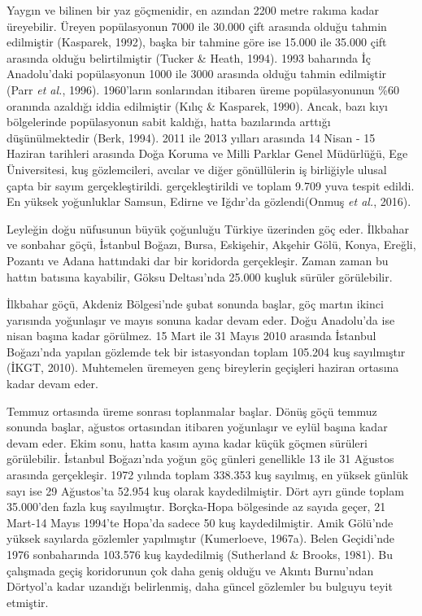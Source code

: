 \documentclass[
  a4paper,
  DIV=11,
  numbers=noendperiod]{scrreprt}
\begin{document}
Yaygın ve bilinen bir yaz göçmenidir, en azından 2200 metre rakıma kadar
üreyebilir. Üreyen popülasyonun 7000 ile 30.000 çift arasında olduğu
tahmin edilmiştir (Kasparek, 1992), başka bir tahmine göre ise 15.000
ile 35.000 çift arasında olduğu belirtilmiştir (Tucker \& Heath, 1994).
1993 baharında İç Anadolu'daki popülasyonun 1000 ile 3000 arasında
olduğu tahmin edilmiştir (Parr \emph{et al.}, 1996). 1960'ların
sonlarından itibaren üreme popülasyonunun \%60 oranında azaldığı iddia
edilmiştir (Kılıç \& Kasparek, 1990). Ancak, bazı kıyı bölgelerinde
popülasyonun sabit kaldığı, hatta bazılarında arttığı düşünülmektedir
(Berk, 1994). 2011 ile 2013 yılları arasında 14 Nisan - 15 Haziran
tarihleri arasında Doğa Koruma ve Milli Parklar Genel Müdürlüğü, Ege
Üniversitesi, kuş gözlemcileri, avcılar ve diğer gönüllülerin iş
birliğiyle ulusal çapta bir sayım gerçekleştirildi. gerçekleştirildi ve
toplam 9.709 yuva tespit edildi. En yüksek yoğunluklar Samsun, Edirne ve
Iğdır'da gözlendi(Onmuş \emph{et al.}, 2016).

Leyleğin doğu nüfusunun büyük çoğunluğu Türkiye üzerinden göç eder.
İlkbahar ve sonbahar göçü, İstanbul Boğazı, Bursa, Eskişehir, Akşehir
Gölü, Konya, Ereğli, Pozantı ve Adana hattındaki dar bir koridorda
gerçekleşir. Zaman zaman bu hattın batısına kayabilir, Göksu Deltası'nda
25.000 kuşluk sürüler görülebilir.

İlkbahar göçü, Akdeniz Bölgesi'nde şubat sonunda başlar, göç martın
ikinci yarısında yoğunlaşır ve mayıs sonuna kadar devam eder. Doğu
Anadolu'da ise nisan başına kadar görülmez. 15 Mart ile 31 Mayıs 2010
arasında İstanbul Boğazı'nda yapılan gözlemde tek bir istasyondan toplam
105.204 kuş sayılmıştır (İKGT, 2010). Muhtemelen üremeyen genç
bireylerin geçişleri haziran ortasına kadar devam eder.

Temmuz ortasında üreme sonrası toplanmalar başlar. Dönüş göçü temmuz
sonunda başlar, ağustos ortasından itibaren yoğunlaşır ve eylül başına
kadar devam eder. Ekim sonu, hatta kasım ayına kadar küçük göçmen
sürüleri görülebilir. İstanbul Boğazı'nda yoğun göç günleri genellikle
13 ile 31 Ağustos arasında gerçekleşir. 1972 yılında toplam 338.353 kuş
sayılmış, en yüksek günlük sayı ise 29 Ağustos'ta 52.954 kuş olarak
kaydedilmiştir. Dört ayrı günde toplam 35.000'den fazla kuş sayılmıştır.
Borçka-Hopa bölgesinde az sayıda geçer, 21 Mart-14 Mayıs 1994'te Hopa'da
sadece 50 kuş kaydedilmiştir. Amik Gölü'nde yüksek sayılarda gözlemler
yapılmıştır (Kumerloeve, 1967a). Belen Geçidi'nde 1976 sonbaharında
103.576 kuş kaydedilmiş (Sutherland \& Brooks, 1981). Bu çalışmada geçiş
koridorunun çok daha geniş olduğu ve Akıntı Burnu'ndan Dörtyol'a kadar
uzandığı belirlenmiş, daha güncel gözlemler bu bulguyu teyit etmiştir.
\end{document}
